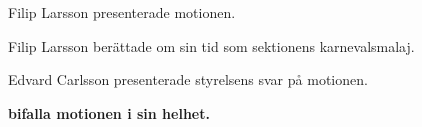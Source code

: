 \documentclass[10pt]{article}
\begin{document}
\begin{paragrafer}
\begin{comment}
Matilda- smalare är bättre och kul att vi kan ändra. Rosett är inte lika fint. 

Saga lyfte frågan om rosett vs band + rosett. 

Love frågade om TLThs standard för ordensband och frackband. Pontus svarade att det breda vbandet är ordensband och den smala är frackkavaj.

Matilda tyckteen ide att sektionen ska subventionera tjejbandet eftersom det är dyrare men att det är vikigt att det är enhetligt. 
Sophia tyckte att det smalare för killar 

Ester tycker om det gamla för killarna. vill själv ha ett långt band men vill inte fästa det i sin klänning då det blir märken. Tror inte det ser fullt ut att någon har rosett och om någon har band.
Davida Stor vinst är att slippa sätta nålar i kläningen.
Filip - sammantattning. Konsensus är att vi tycker det gamla bandet på killar men samma på tjejer fast bredare. 
Sophia - Har inte data en tjockare för tjejer? Matilda svarade att de ha två olika tjocklekar. 
Adam - Går att fixa glattare band med samma mönster. Tycker inte att diskussionen ger något mer nu. 

Henrik - vill göra en live undersökning under mötet så att man får underhåll.
Majoritet - OK om det är dyrare
Lika dana band för killar och tjejer. Mixad åsikt. 
Glattare band för att ha en tyngd på. Få svar, mixat. 
Sektionsrepresenativt på. 
--- HACKE 
--- Krusidull E -> Majoritet. 

Bredare för tjejer än för killar - OK Majoritet

Olika alternativ för tjejer, roset och band -> Majoritet. 
Subventionera tjejers band - mixat men majoriet för att subvetionera. 
Samma utseende -> Majoirtet 
\end{comment}

    \begin{paragrafer}

        Filip Larsson presenterade motionen. 

        Filip Larsson berättade om sin tid som sektionens karnevalsmalaj.  


        Edvard Carlsson presenterade styrelsens svar på motionen. 

        \textbf{\Mba bifalla motionen i sin helhet.}



\end{paragrafer}
\end{paragrafer}
\end{document}
